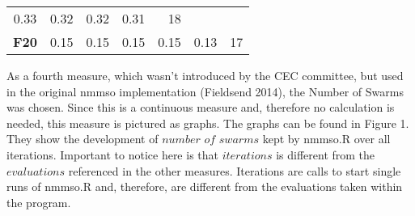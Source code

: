 \documentclass[12pt,a4paper]{article}
\begin{document}
\begin{longtable}[c]{@{}crrrrrr@{}}
\begin{minipage}[t]{0.08\columnwidth}
0.33
\strut\end{minipage} &
\begin{minipage}[t]{0.09\columnwidth}\raggedleft\strut
0.32
\strut\end{minipage} &
\begin{minipage}[t]{0.10\columnwidth}\raggedleft\strut
0.32
\strut\end{minipage} &
\begin{minipage}[t]{0.11\columnwidth}\raggedleft\strut
0.31
\strut\end{minipage} &
\begin{minipage}[t]{0.07\columnwidth}\raggedleft\strut
18
\strut\end{minipage}\tabularnewline
\begin{minipage}[t]{0.11\columnwidth}\centering\strut
\textbf{F20}
\strut\end{minipage} &
\begin{minipage}[t]{0.07\columnwidth}\raggedleft\strut
0.15
\strut\end{minipage} &
\begin{minipage}[t]{0.08\columnwidth}\raggedleft\strut
0.15
\strut\end{minipage} &
\begin{minipage}[t]{0.09\columnwidth}\raggedleft\strut
0.15
\strut\end{minipage} &
\begin{minipage}[t]{0.10\columnwidth}\raggedleft\strut
0.15
\strut\end{minipage} &
\begin{minipage}[t]{0.11\columnwidth}\raggedleft\strut
0.13
\strut\end{minipage} &
\begin{minipage}[t]{0.07\columnwidth}\raggedleft\strut
17
\strut\end{minipage}\tabularnewline
\bottomrule
\end{longtable}

As a fourth measure, which wasn't introduced by the CEC committee, but
used in the original nmmso implementation (Fieldsend 2014), the Number
of Swarms was chosen. Since this is a continuous measure and, therefore
no calculation is needed, this measure is pictured as graphs. The graphs
can be found in Figure 1. They show the development of \(number\) \(of\)
\(swarms\) kept by nmmso.R over all iterations. Important to notice here
is that \(iterations\) is different from the \(evaluations\) referenced
in the other measures. Iterations are calls to start single runs of
nmmso.R and, therefore, are different from the evaluations taken within
the program.
\end{document}
